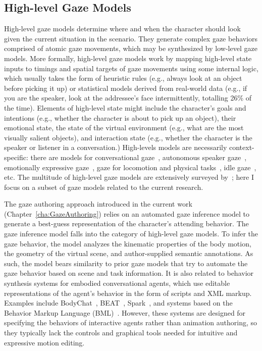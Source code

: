 \subsection{High-level Gaze Models}

High-level gaze models determine where and when the character should look given the current situation in the scenario. They generate complex gaze behaviors comprised of atomic gaze movements, which may be synthesized by low-level gaze models. More formally, high-level gaze models work by mapping high-level state inputs to timings and spatial targets of gaze movements using some internal logic, which usually takes the form of heuristic rules (e.g., always look at an object before picking it up) or statistical models derived from real-world data (e.g., if you are the speaker, look at the addressee's face intermittently, totalling 26\% of the time). Elements of high-level state might include the character's goals and intentions (e.g., whether the character is about to pick up an object), their emotional state, the state of the virtual environment (e.g., what are the most visually salient objects), and interaction state (e.g., whether the character is the speaker or listener in a conversation.) High-levels models are necessarily context-specific: there are models for conversational gaze~\citep{pelachaud2003modelling,masuko2007headeye,gratch2007rapport,andrist2013aversion,lee2007rickel}, autonomous speaker gaze~\citep{bee2010gaze,zoric2011oncreating,marsella2013virtual}, emotionally expressive gaze~\citep{queiroz2007automatic,lance2010expressive,li2012emotional}, gaze for locomotion and physical tasks~\citep{khullar2001look,mitake2007reactive,huang2016planning}, idle gaze~\citep{khullar2001look,peters2003bottomup,mitake2007reactive,peters2008applying,cafaro2009animating,grillon2009crowds,kokkinara2011modelling}, etc. The multitude of high-level gaze models are extensively surveyed by~\citet{ruhland2015gazereview}; here I focus on a subset of gaze models related to the current research.

The gaze authoring approach introduced in the current work (Chapter~\ref{cha:GazeAuthoring}) relies on an automated gaze inference model to generate a best-guess representation of the character's attending behavior. The gaze inference model falls into the category of high-level gaze models. To infer the gaze behavior, the model analyzes the kinematic properties of the body motion, the geometry of the virtual scene, and author-supplied semantic annotations. As such, the model bears similarity to prior gaze models that try to automate the gaze behavior based on scene and task information. It is also related to behavior synthesis systems for embodied conversational agents, which use editable representations of the agent's behavior in the form of scripts and XML markup. Examples include BodyChat~\citep{vilhjalmsson1998bodychat}, BEAT~\citep{cassell1999fully}, Spark~\citep{vilhjalmsson2004animating}, and systems based on the Behavior Markup Language (BML)~\citep{vilhjalmsson2007bml}. However, these systems are designed for specifying the behaviors of interactive agents rather than animation authoring, so they typically lack the controls and graphical tools needed for intuitive and expressive motion editing.

